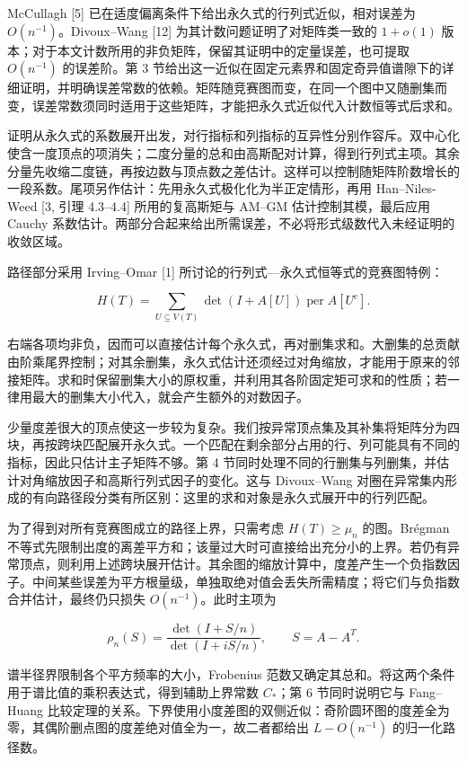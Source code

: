 \documentclass[11pt,a4paper]{article}
\begin{document}
McCullagh {[}5{]} 已在适度偏离条件下给出永久式的行列式近似，相对误差为 \(O(n^{-1})\)。Divoux--Wang {[}12{]} 为其计数问题证明了对矩阵类一致的 \(1+o(1)\) 版本；对于本文计数所用的非负矩阵，保留其证明中的定量误差，也可提取 \(O(n^{-1})\) 的误差阶。第 3 节给出这一近似在固定元素界和固定奇异值谱隙下的详细证明，并明确误差常数的依赖。矩阵随竞赛图而变，在同一个图中又随删集而变，误差常数须同时适用于这些矩阵，才能把永久式近似代入计数恒等式后求和。

证明从永久式的系数展开出发，对行指标和列指标的互异性分别作容斥。双中心化使含一度顶点的项消失；二度分量的总和由高斯配对计算，得到行列式主项。其余分量先收缩二度链，再按边数与顶点数之差估计。这样可以控制随矩阵阶数增长的一段系数。尾项另作估计：先用永久式极化化为半正定情形，再用 Han--Niles-Weed {[}3, 引理 4.3--4.4{]} 所用的复高斯矩与 AM--GM 估计控制其模，最后应用 Cauchy 系数估计。两部分合起来给出所需误差，不必将形式级数代入未经证明的收敛区域。

路径部分采用 Irving--Omar {[}1{]} 所讨论的行列式---永久式恒等式的竞赛图特例：

\[H(T)=\sum_{U\subseteq V(T)}\det(I+A[U])\operatorname{per}A[U^c].\]

右端各项均非负，因而可以直接估计每个永久式，再对删集求和。大删集的总贡献由阶乘尾界控制；对其余删集，永久式估计还须经过对角缩放，才能用于原来的邻接矩阵。求和时保留删集大小的原权重，并利用其各阶固定矩可求和的性质；若一律用最大的删集大小代入，就会产生额外的对数因子。

少量度差很大的顶点使这一步较为复杂。我们按异常顶点集及其补集将矩阵分为四块，再按跨块匹配展开永久式。一个匹配在剩余部分占用的行、列可能具有不同的指标，因此只估计主子矩阵不够。第 4 节同时处理不同的行删集与列删集，并估计对角缩放因子和高斯行列式因子的变化。这与 Divoux--Wang 对圈在异常集内形成的有向路径段分类有所区别：这里的求和对象是永久式展开中的行列匹配。

为了得到对所有竞赛图成立的路径上界，只需考虑 \(H(T)\ge\mu_n\) 的图。Brégman 不等式先限制出度的离差平方和；该量过大时可直接给出充分小的上界。若仍有异常顶点，则利用上述跨块展开估计。其余图的缩放计算中，度差产生一个负指数因子。中间某些误差为平方根量级，单独取绝对值会丢失所需精度；将它们与负指数合并估计，最终仍只损失 \(O(n^{-1})\)。此时主项为

\[\rho_n(S)=\frac{\det(I+S/n)}{\det(I+iS/n)},\qquad S=A-A^T.\]

谱半径界限制各个平方频率的大小，Frobenius 范数又确定其总和。将这两个条件用于谱比值的乘积表达式，得到辅助上界常数 \(C_*\)；第 6 节同时说明它与 Fang--Huang 比较定理的关系。下界使用小度差图的双侧近似：奇阶圆环图的度差全为零，其偶阶删点图的度差绝对值全为一，故二者都给出 \(L-O(n^{-1})\) 的归一化路径数。
\end{document}
